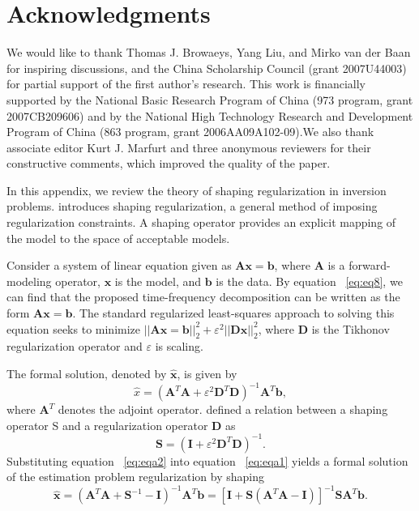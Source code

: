 \section{Acknowledgments}

We would like to thank Thomas J. Browaeys, Yang Liu, and
Mirko van der Baan for inspiring discussions, and the China
Scholarship Council (grant 2007U44003) for partial support of
the first author’s research. This work is financially supported by
the National Basic Research Program of China (973 program, grant
2007CB209606) and by the National High Technology Research
and Development Program of China (863 program, grant
2006AA09A102-09).We also thank associate editor Kurt J. Marfurt
and three anonymous reviewers for their constructive comments,
which improved the quality of the paper.


In this appendix, we review the theory of shaping regularization
in inversion problems. \cite{Fomel2007b} introduces shaping regularization,
a general method of imposing regularization constraints. A
shaping operator provides an explicit mapping of the model to the
space of acceptable models.

Consider a system of linear equation given as $\mathbf{Ax} = \mathbf{b}$, where $\mathbf{A}$ is
a forward-modeling operator, $\mathbf{x}$ is the model, and $\mathbf{b}$ is the data. By
equation ~\ref{eq:eq8}, we can find that the proposed time-frequency decomposition
can be written as the form $\mathbf{Ax} = \mathbf{b}$. The standard regularized
least-squares approach to solving this equation seeks to
minimize $\left| \left| \mathbf{Ax} = \mathbf{b} \right| \right| _{2}^{2}+\varepsilon ^{2} \left| \left| \mathbf{Dx} \right| \right| _{2}^{2}$, where $\mathbf{D}$ is the Tikhonov regularization
operator \cite[]{Tikhonov1963} and $\varepsilon$ is scaling.

The formal solution, denoted by $\hat{\mathbf{x}}$, is given by
      \begin{equation}
          \hat{x}=\left( \mathbf{A}^{T}\mathbf{A}+\varepsilon ^{2}\mathbf{D}^{T}\mathbf{D}\right)^{-1}\mathbf{A}^{T}\mathbf{b},
        \label{eq:eqa1}
      \end{equation}
where $\mathbf{A}^{T}$ denotes the adjoint operator. \cite{Fomel2007b} defined a
relation between a shaping operator S and a regularization operator
$\mathbf{D}$ as
      \begin{equation}
          \mathbf{S}=\left(\mathbf{I}+\varepsilon ^{2}\mathbf{D}^{T}\mathbf{D}\right)^{-1}.
        \label{eq:eqa2}
      \end{equation}
Substituting equation  ~\ref{eq:eqa2} into equation  ~\ref{eq:eqa1} yields a formal
solution of the estimation problem regularization by shaping
      \begin{equation}
          \mathbf{\hat{x}}=\left(\mathbf{A}^{T}\mathbf{A}+\mathbf{S}^{-1} -\mathbf{I}\right)^{-1}\mathbf{A}^{T}\mathbf{b}=\left[\mathbf{I}+\mathbf{S}\left(\mathbf{A}^{T}\mathbf{A}-\mathbf{I}\right)\right]^{-1}\mathbf{S}\mathbf{A}^{T}\mathbf{b}.
        \label{eq:eqa3}
      \end{equation}

